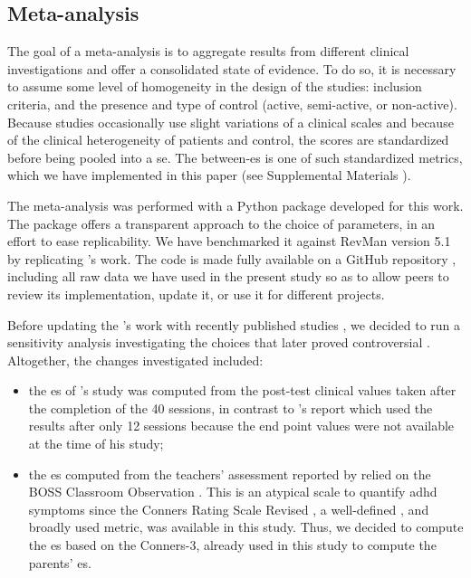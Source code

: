 \subsection{Meta-analysis}

The goal of a meta-analysis is to aggregate results from different clinical investigations and offer a 
consolidated state of evidence. To do so, it is necessary to assume 
some level of homogeneity in the design of the studies: inclusion criteria, and the presence and type of control 
(active, semi-active, or non-active). Because studies occasionally 
use slight variations of a clinical scales and because of the clinical heterogeneity of patients and control, 
the scores are standardized before being pooled into a \gls{se}. The between-\gls{es} is one of such standardized metrics, 
which we have implemented in this paper (see Supplemental Materials \citep{Supplementalmaterial}). 

The meta-analysis was performed with a Python package developed for this work. The package offers a transparent 
approach to the choice of parameters, in an effort to ease replicability. We have benchmarked it against RevMan version 5.1 
\citep[UK, London]{RevMan} by replicating \citet{Cortese2016}'s work. 
The code is made fully available on a GitHub repository \citep{Bussalb2018}, including all raw data we have used
in the present study so as to allow peers to review its implementation, update it, or use it for different projects. 
 
Before updating the \citet{Cortese2016}'s work with recently published studies
\citep{Strehl2017, Baumeister2016}, we decided to run a sensitivity analysis investigating the choices 
that later proved controversial \citep{Micoulaud2016}. Altogether, the changes investigated included:
\begin{itemize}
\item the \gls{es} of \citeauthor{Arnold2014}'s study was computed from the post-test clinical values taken 
after the completion of the 40 sessions, in contrast to \citet{Cortese2016}'s report which used the results 
after only 12 sessions because the end point values were not available at the time of his study;
\item the \gls{es} computed from the teachers' assessment reported by \citet{Steiner2014} relied on the BOSS 
Classroom Observation \citep{Shapiro2010}. This is an atypical scale to quantify \gls{adhd} symptoms since 
the Conners Rating Scale Revised \citep{Conners1998, Christiansen2014, Bluschke2016}, a well-defined
\citep{Collett2003, Epstein2012}, and broadly used metric, was available in this study. Thus, we decided 
to compute the \gls{es} based on the Conners-3, already used in this study to compute the 
parents' \gls{es}.  
\end{itemize} 


